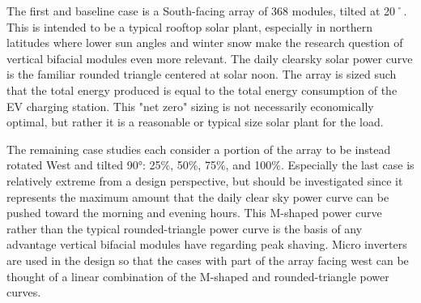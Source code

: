 \documentclass[journal,article,submit,pdftex,moreauthors]{Definitions/mdpi}
\begin{document}
The first and baseline case is a South-facing array of 368 modules,
tilted at 20˚. This is intended to be a typical rooftop solar plant,
especially in northern latitudes where lower sun angles and winter snow
make the research question of vertical bifacial modules even more
relevant. The daily clearsky solar power curve is the familiar rounded
triangle centered at solar noon. The array is sized such that the total
energy produced is equal to the total energy consumption of the EV
charging station. This "net zero" sizing is not necessarily economically
optimal, but rather it is a reasonable or typical size solar plant for
the load.

The remaining case studies each consider a portion of the array to be
instead rotated West and tilted 90°: 25\%, 50\%, 75\%, and 100\%.
Especially the last case is relatively extreme from a design
perspective, but should be investigated since it represents the maximum
amount that the daily clear sky power curve can be pushed toward the
morning and evening hours. This M-shaped power curve rather than the
typical rounded-triangle power curve is the basis of any advantage
vertical bifacial modules have regarding peak shaving. Micro inverters
are used in the design so that the cases with part of the array facing
west can be thought of a linear combination of the M-shaped and
rounded-triangle power curves.
\end{document}

